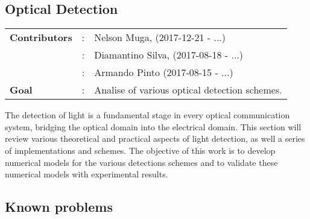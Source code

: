\begin{bibunit}[plain]

\clearpage
\section{Optical Detection}

\begin{tcolorbox}	
\begin{tabular}{p{2.75cm} p{0.2cm} p{10.5cm}}
\textbf{Contributors}  &:& Nelson Muga, (2017-12-21 - ...)\\
                       &:& Diamantino Silva, (2017-08-18 - ...)\\
                       &:& Armando Pinto (2017-08-15 - ...)\\
\textbf{Goal}          &:& Analise of various optical detection schemes.\\
\end{tabular}
\end{tcolorbox}
%
\vspace{2em}
%
The detection of light is a fundamental stage in every optical communication system, bridging the optical domain into the electrical domain. This section will review various theoretical and practical aspects of light detection, as well a series of implementations and schemes.
The objective of this work is to develop numerical models for the various detections schemes and to validate these numerical models with experimental results.\\
%
%





%
%
\subsection{Known problems}
%
%
\end{bibunit}
%
